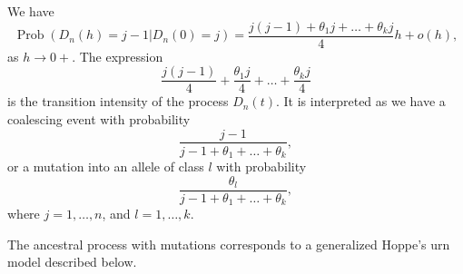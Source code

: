 \documentclass[12pt]{amsart}
\theoremstyle{definition}
\numberwithin{equation}{section}
\DeclareMathOperator{\Prob}{Prob}
\begin{document}
We have
\begin{equation}
\Prob\left(D_n(h)=j-1|D_n(0)=j\right)=
\frac{j(j-1)+\theta_1j+\ldots+\theta_kj}{4}h+o(h),
\end{equation}
as $h\rightarrow 0+$. The expression
$$
\frac{j(j-1)}{4}+\frac{\theta_1 j}{4}+\ldots+\frac{\theta_kj}{4}
$$
is  the transition intensity of the process $D_n(t)$. It is interpreted as
we have a coalescing event with probability
\begin{equation}\label{CoalescentProbability}
\frac{j-1}{j-1+\theta_1+\ldots+\theta_k},
\end{equation}
or a mutation into an allele of class $l$ with probability
\begin{equation}\label{MutationProbability}
\frac{\theta_l}{j-1+\theta_1+\ldots+\theta_k},
\end{equation}
where  $j=1,\ldots,n$, and $l=1,\ldots,k$.

The ancestral process with mutations corresponds
to a generalized Hoppe's urn model described below.

\end{document}
